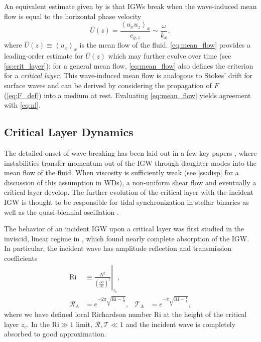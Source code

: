 \documentclass[
        fleqn,
        usenatbib,
    ]{mnras}
\newcommand*{\pd}[2]{\frac{\partial#1}{\partial#2}}
\newcommand*{\at}[1]{\left.#1\right|}
\newcommand*{\ev}[1]{\left\langle#1\right\rangle}
\newcommand*{\p}[1]{\left(#1\right)}
\begin{document}
An equivalent estimate given by \citep{eliassen_palm_cite,sutherland0} is that
IGWs break when the wave-induced mean flow is equal to the horizontal phase
velocity
\begin{equation}
    \overline{U}(z) = \frac{\ev{u_{x}u_{z}}_x}{c_{g,z}} \sim
        \frac{\omega}{k_x},\label{eq:mean_flow}
\end{equation}
where $\bar{U}(z) \equiv \ev{u_x}_x$ is the mean flow of the fluid.
\autoref{eq:mean_flow} provides a leading-order estimate for $\bar{U}(z)$ which
may further evolve over time (see \autoref{ss:crit_layer}); for a general mean
flow, \autoref{eq:mean_flow} also defines the criterion for a \emph{critical
layer}. This wave-induced mean flow is analogous to Stokes' drift for surface
waves and can be derived by considering the propagation of $F$
(\autoref{eq:F_def}) into a medium at rest. Evaluating \autoref{eq:mean_flow} yields
agreement with \autoref{eq:nl}.

\subsection{Critical Layer Dynamics}\label{ss:crit_layer}


The detailed onset of wave breaking has been laid out in a few key papers
\citep{drazin, klostermeyer, winters1994}, where instabilities transfer momentum
out of the IGW through daughter modes into the mean flow of the fluid. When
viscosity is sufficiently weak (see \autoref{ss:disp} for a discussion of this
assumption in WDs), a non-uniform shear flow and eventually a critical layer
develop. The further evolution of the critical layer with the incident IGW is
thought to be responsible for tidal synchronization in stellar binaries
\citep{zahn75,gn89} as well as the quasi-biennial oscillation
\citep{lindzen_qbo}.

The behavior of an incident IGW upon a critical layer was first studied in the
inviscid, linear regime in \citep{booker_bretherton}, which found nearly
complete absorption of the IGW\@. In particular, the incident wave has amplitude
reflection and transmission coefficients
\begin{align}
    \mathrm{Ri} &\equiv \at{\frac{N^2}{\p{\pd{\overline{U}}{z}}^2}}_{z_c},
        \label{eq:ri_def}\\
    \mathcal{R}_A &= e^{-2\pi \sqrt{\mathrm{Ri} - \frac{1}{4}}}, &
    \mathcal{T}_A &= e^{-\pi \sqrt{\mathrm{Ri} - \frac{1}{4}}},
        \label{eq:crit_coeffs}
\end{align}
where we have defined local Richardson number Ri at the height of the critical
layer $z_c$. In the $\mathrm{Ri} \gg 1$ limit, $\mathcal{R}, \mathcal{T} \ll 1$
and the incident wave is completely absorbed to good approximation.
\end{document}
